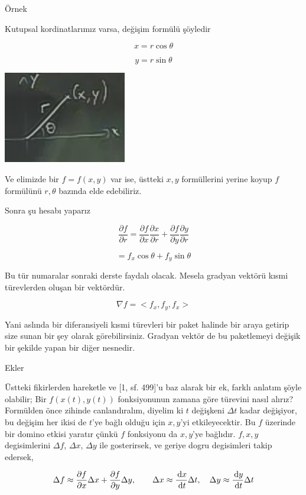 \documentclass[12pt,fleqn]{article}\usepackage{../../common}
\begin{document}
Örnek

Kutupsal kordinatlarımız varsa, değişim formülü şöyledir

$$ x = r \cos \theta $$

$$ y = r \sin \theta $$

\includegraphics[height=4cm]{11_1.png}

Ve elimizde bir $f=f(x,y)$ var ise, üstteki $x,y$ formüllerini yerine koyup $f$
formülünü $r,\theta$ bazında elde edebiliriz.

Sonra şu hesabı yaparız

$$ 
\frac{\partial f}{\partial r} = 
\frac{\partial f}{\partial x}
\frac{\partial x}{\partial r} +
\frac{\partial f}{\partial y}
\frac{\partial y}{\partial r}
$$

$$ = f_x\cos \theta + f_y \sin \theta $$

Bu tür numaralar sonraki derste faydalı olacak. Mesela gradyan vektörü
kısmi türevlerden oluşan bir vektördür. 

$$ \nabla f = < f_x,f_y,f_x > $$

Yani aslında bir diferansiyeli kısmi türevleri bir paket halinde bir araya
getirip size sunan bir şey olarak görebilirsiniz. Gradyan vektör de bu
paketlemeyi değişik bir şekilde yapan bir diğer nesnedir. 

Ekler

Üstteki fikirlerden hareketle ve [1, sf. 499]'u baz alarak bir ek, farklı
anlatım şöyle olabilir; Bir $f(x(t),y(t))$ fonksiyonunun zamana göre türevini
nasıl alırız? Formülden önce zihinde canlandıralım, diyelim ki $t$ değişkeni
$\Delta t$ kadar değişiyor, bu değişim her ikisi de $t$'ye bağlı olduğu için
$x,y$'yi etkileyecektir. Bu $f$ üzerinde bir domino etkisi yaratır çünkü $f$
fonksiyonu da $x,y$'ye bağlıdır. $f,x,y$ degisimlerini $\Delta f$, $\Delta x$,
$\Delta y$ ile gosterirsek, ve geriye dogru degisimleri takip edersek,

$$
\Delta f \approx
\frac{\partial f}{\partial x} \Delta x +
\frac{\partial f}{\partial y} \Delta y,
\qquad
\Delta x \approx \frac{\,\mathrm{d} x}{\,\mathrm{d} t} \Delta t, 
\quad
\Delta y \approx \frac{\,\mathrm{d} y}{\,\mathrm{d} t} \Delta t
$$
\end{document}
